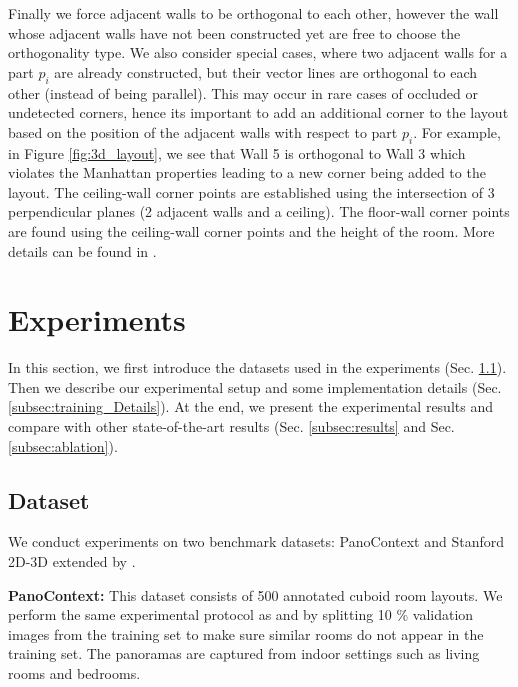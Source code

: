 \documentclass[final]{cvpr}
\begin{document}
Finally we force adjacent walls to be orthogonal to each other, however the wall whose adjacent walls have not been constructed yet are free to choose the orthogonality type. We also consider special cases, where two adjacent walls for a part $p_i$ are already constructed, but their vector lines are orthogonal to each other (instead of being parallel). This may occur in rare cases of occluded or undetected corners, hence its important to add an additional corner to the layout based on the position of the adjacent walls with respect to part $p_i$. For example, in Figure \ref{fig:3d_layout}, we see that Wall 5 is orthogonal to Wall 3 which violates the Manhattan properties leading to a new corner being added to the layout. The ceiling-wall corner points are established using the intersection of 3 perpendicular planes (2 adjacent walls and a ceiling). The floor-wall corner points are found using the ceiling-wall corner points and the height of the room. More details can be found in \cite{sun2019horizonnet}.



\section{Experiments}\label{sec:exp}




In this section, we first introduce the datasets used in the experiments (Sec. \ref{subsec:data}). Then we describe our experimental setup and some implementation details (Sec. \ref{subsec:training_Details}).
At the end, we present the experimental results and compare with other state-of-the-art results (Sec. \ref{subsec:results} and Sec. \ref{subsec:ablation}).


\subsection{Dataset}\label{subsec:data}
We conduct experiments on two benchmark datasets: PanoContext \cite{zhang2014panocontext} and Stanford 2D-3D \cite{armeni2017joint} extended by \cite{zou2018layoutnet}.

\textbf{PanoContext:} This dataset consists of 500 annotated cuboid room layouts. We perform the same experimental protocol as \cite{sun2019horizonnet} and \cite{zou2018layoutnet} by
splitting 10 $\%$ validation images from the training set to make sure similar rooms do not appear in the training set. The panoramas are captured from indoor settings such as living rooms and bedrooms.
\end{document}
